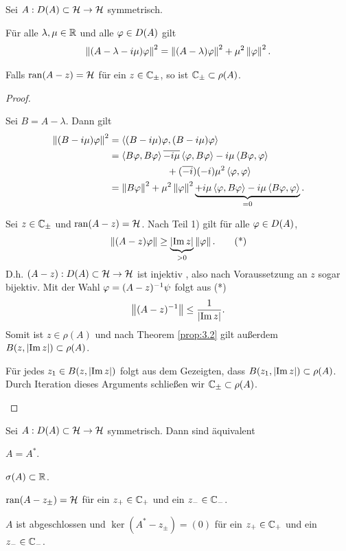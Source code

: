 \begin{prop}
\label{prop:4.3}
Sei $A: D(A)\subset \mathcal{H}\to \mathcal{H}$ symmetrisch.
\begin{propenum}
\item Für alle $\lambda,\mu\in\mathbb{R}$ und alle $\varphi\in D(A)$ gilt
\begin{align*}
\left\|(A-\lambda-i\mu)\varphi\right\|^2 = \left\|(A-\lambda)\varphi\right\|^2 + \mu^2\left\|\varphi\right\|^2.
\end{align*}
\item Falls $\operatorname{ran}(A-z) = \mathcal{H}$ für ein $z\in\mathbb{C}_\pm$, so ist $\mathbb{C}_\pm\subset
\rho(A)$.\fishhere
\end{propenum}
\end{prop}
\begin{proof}
\begin{proofenum}
\item Sei $B=A-\lambda$. Dann gilt
\begin{align*}
\left\|(B-i\mu)\varphi\right\|^2
&= \left\langle(B-i\mu)\varphi,(B-i\mu)\varphi\right\rangle\\
&= \left\langle B\varphi,B\varphi\right\rangle \overline{-i\mu}\left\langle\varphi,B\varphi\right\rangle
- i\mu\left\langle B\varphi,\varphi\right\rangle \\
&\qquad\qquad\qquad
+(\overline{-i})(-i)\mu^2\left\langle\varphi,\varphi\right\rangle\\
&= 
\left\|B\varphi\right\|^2+\mu^2\left\|\varphi\right\|^2 
\underbrace{+i\mu\left\langle\varphi,B\varphi\right\rangle
- i\mu\left\langle B\varphi,\varphi\right\rangle}_{=0}.
\end{align*}
\item Sei $z\in\mathbb{C}_\pm$ und $\operatorname{ran}(A-z) =\mathcal{H}$. Nach Teil 1) gilt für
alle $\varphi\in D(A)$,
\begin{align*}
\left\|(A-z)\varphi\right\| \ge \underbrace{\left|\operatorname{Im} z\right|}_{>0}\left\|\varphi\right\|.\tag{*}
\end{align*}
D.h. $(A-z) : D(A)\subset \mathcal{H} \to \mathcal{H}$ ist injektiv , also nach Voraussetzung an
$z$ sogar bijektiv. Mit der Wahl $\varphi=(A-z)^{-1}\psi$ folgt aus (*)
\begin{align*}
\left\|(A-z)^{-1}\right\| \le \frac{1}{\left|\operatorname{Im} z\right|}.
\end{align*}
Somit ist $z\in\rho(A)$ und nach Theorem \ref{prop:3.2} gilt außerdem
$B(z,\left|\operatorname{Im} z\right|) \subset\rho(A)$.

Für jedes $z_1\in B(z,\left|\operatorname{Im} z\right|)$ folgt aus dem Gezeigten,
dass $B(z_1,\left|\operatorname{Im} z\right|) \subset\rho(A)$. Durch Iteration dieses Arguments
schließen wir $\mathbb{C}_\pm\subset \rho(A)$.\qedhere
\end{proofenum}
\end{proof}

\begin{thm}
\label{prop:4.4}
Sei $A: D(A)\subset \mathcal{H}\to \mathcal{H}$ symmetrisch. Dann sind äquivalent
\begin{propenum}
\item\label{prop:4.4:1} $A=A^*$.
\item\label{prop:4.4:2} $\sigma(A) \subset \mathbb{R}$.
\item\label{prop:4.4:3} $\operatorname{ran}(A-z_\pm) = \mathcal{H}$ für ein $z_+\in \mathbb{C}_+$ und ein
$z_-\in \mathbb{C}_-$.
\item\label{prop:4.4:4} $A$ ist abgeschlossen und $\ker(A^*-z_\pm) = (0)$ für
ein $z_+\in \mathbb{C}_+$ und ein $z_-\in \mathbb{C}_-$.\fishhere
\end{propenum}
\end{thm}

